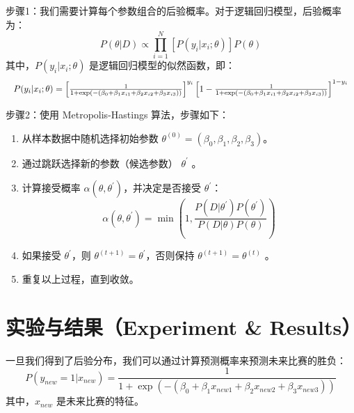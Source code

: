 \documentclass[12pt]{article}
\begin{document}
步骤1：我们需要计算每个参数组合的后验概率。对于逻辑回归模型，后验概率为：
\begin{equation}
    P(\theta|D)\propto\prod_{i=1}^N\left[P(y_i|x_i;\theta)\right]P(\theta)
\end{equation}
其中，$P(y_i|x_i;\theta)$ 是逻辑回归模型的似然函数，即：
\begin{equation}
	\resizebox{\textwidth}{!}{$
	P(y_i|x_i;\theta)=\left[\frac{1}{1+\exp(-(\beta_0+\beta_1x_{i1}+\beta_2x_{i2}+\beta_3x_{i3}))}\right]^{y_i}\left[1-\frac{1}{1+\exp(-(\beta_0+\beta_1x_{i1}+\beta_2x_{i2}+\beta_3x_{i3}))}\right]^{1-y_i}
	$}
\end{equation}

步骤2：使用 Metropolis-Hastings 算法，步骤如下：
\begin{enumerate}
	\item 从样本数据中随机选择初始参数 $\theta^{(0)}=(\beta_0,\beta_1,\beta_2,\beta_3)$。
	\item 通过跳跃选择新的参数（候选参数） $\theta^{\prime}$ 。
	\item 计算接受概率 $\alpha(\theta,\theta^{\prime})$，并决定是否接受 $\theta^{\prime}$：
	\begin{equation}
		\alpha(\theta,\theta^{\prime})=\min\left(1,\frac{P(D|\theta^{\prime})P(\theta^{\prime})}{P(D|\theta)P(\theta)}\right)
	\end{equation}
	\item 如果接受 $\theta^{\prime}$，则 $\theta^{(t+1)}=\theta^{\prime}$，否则保持 $\theta^{(t+1)}=\theta^{(t)}$ 。
	\item 重复以上过程，直到收敛。
\end{enumerate}


\section{实验与结果（Experiment \& Results）}

一旦我们得到了后验分布，我们可以通过计算预测概率来预测未来比赛的胜负：
\begin{equation}
    P(y_{new}=1|x_{new})=\frac{1}{1+\exp(-(\beta_0+\beta_1x_{new1}+\beta_2x_{new2}+\beta_3x_{new3}))}
\end{equation}
其中，$x_{new}$ 是未来比赛的特征。
\end{document}
